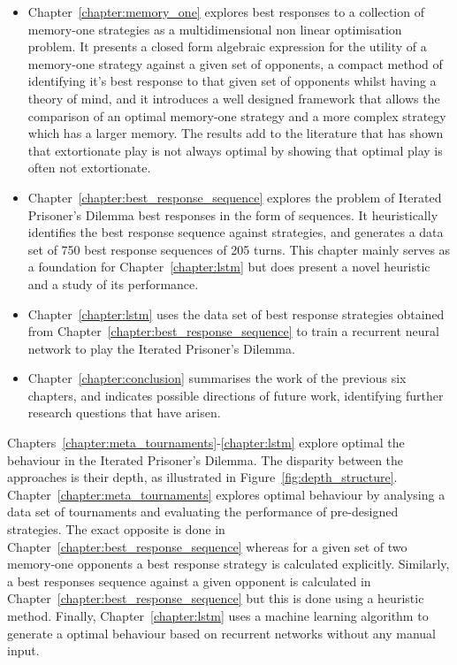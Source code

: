 \begin{itemize}
    \item Chapter~\ref{chapter:memory_one} explores best responses to a
    collection of memory-one strategies as a multidimensional non linear
    optimisation problem. It presents a closed form algebraic expression for the
    utility of a memory-one strategy against a given set of opponents, a
    compact method of identifying it's best response to that given set of
    opponents whilst having a theory of mind, and it introduces a well designed
    framework that allows the comparison of an optimal memory-one strategy and a
    more complex strategy which has a larger memory. The results add to the
    literature that has shown that extortionate play is not always optimal by
    showing that optimal play is often not extortionate.
    \item Chapter~\ref{chapter:best_response_sequence} explores the problem of
    Iterated Prisoner's Dilemma best responses in the form of sequences.
    It heuristically identifies the best response sequence against \numberofstrategiesbestsequences strategies,
    and generates a data set of 750 best response sequences of 205 turns.
    This chapter mainly serves as a foundation for Chapter~\ref{chapter:lstm}
    but does present a novel heuristic and a study of its performance.
    \item Chapter~\ref{chapter:lstm} uses the data set of best response strategies
    obtained from Chapter~\ref{chapter:best_response_sequence} to train a recurrent
    neural network to play the Iterated Prisoner's Dilemma.
    \item Chapter~\ref{chapter:conclusion} summarises the work of the previous
    six chapters, and indicates possible directions of future work, identifying
    further research questions that have arisen.
\end{itemize}

Chapters~\ref{chapter:meta_tournaments}-\ref{chapter:lstm} explore optimal the
behaviour in the Iterated Prisoner's Dilemma. The disparity between the
approaches is their depth, as illustrated in Figure~\ref{fig:depth_structure}.
Chapter~\ref{chapter:meta_tournaments} explores optimal behaviour
by analysing a data set of tournaments and evaluating the performance of
pre-designed strategies. The exact opposite is done in
Chapter~\ref{chapter:best_response_sequence} whereas for a given set of two
memory-one opponents a best response strategy is calculated explicitly.
Similarly, a best responses sequence against a given opponent is calculated in
Chapter~\ref{chapter:best_response_sequence} but this is done using a heuristic
method. Finally, Chapter~\ref{chapter:lstm} uses a machine learning algorithm
to generate a optimal behaviour based on recurrent networks without any manual
input.

